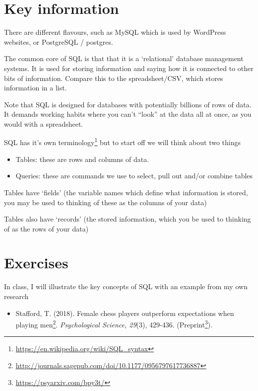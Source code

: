 \documentclass[
  12pt,
  a5paper,
]{book}
\DeclareRobustCommand{\href}[2]{#2\footnote{\url{#1}}}
\providecommand{\tightlist}{%
  \setlength{\itemsep}{0pt}\setlength{\parskip}{0pt}}
\begin{document}
\hypertarget{key-information}{%
\section{Key information}\label{key-information}}

There are different flavours, such as MySQL which is used by WordPress websites, or PostgreSQL / postgres.

The common core of SQL is that that it is a `relational' database management systems. It is used for storing information and saying how it is connected to other bits of information. Compare this to the spreadsheet/CSV, which stores information in a list.

Note that SQL is designed for databases with potentially billions of rows of data. It demands working habits where you can't ``look'' at the data all at once, as you would with a spreadsheet.

SQL has it's \href{https://en.wikipedia.org/wiki/SQL_syntax}{own terminology} but to start off we will think about two things

\begin{itemize}
\tightlist
\item
  Tables: these are rows and columns of data.
\item
  Queries: these are commands we use to select, pull out and/or combine tables
\end{itemize}

Tables have `fields' (the variable names which define what information is stored, you may be used to thinking of these as the columns of your data)

Tables also have `records' (the stored information, which you be used to thinking of as the rows of your data)

\hypertarget{exercises-7}{%
\section{Exercises}\label{exercises-7}}

In class, I will illustrate the key concepts of SQL with an example from my own research

\begin{itemize}
\tightlist
\item
  Stafford, T. (2018). \href{http://journals.sagepub.com/doi/10.1177/0956797617736887}{Female chess players outperform expectations when playing men}. \emph{Psychological Science, 29}(3), 429-436. (\href{https://psyarxiv.com/bpy3t/}{Preprint}).
\end{itemize}
\end{document}

